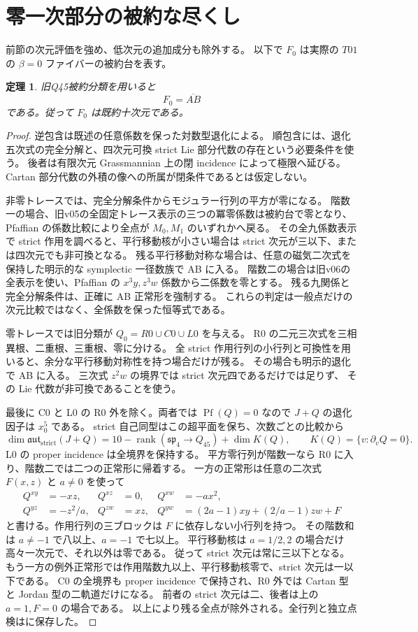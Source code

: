 \documentclass[11pt,a4paper]{ltjsarticle}
\DeclareMathOperator{\rank}{rank}
\newtheorem{theorem}{定理}[section]
\theoremstyle{remark}
\begin{document}
\section{零一次部分の被約な尽くし}
前節の次元評価を強め、低次元の追加成分も除外する。
以下で $F_0$ は実際の $T01$ の $\beta=0$ ファイバーの被約台を表す。
\begin{theorem}\label{thm:zero-jet-exhaustion-v34}
旧Q45被約分類を用いると
\[
 F_0=\overline{AB}
\]
である。従って $F_0$ は既約十次元である。
\end{theorem}
\begin{proof}
逆包含は既述の任意係数を保った対数型退化による。
順包含には、退化五次式の完全分解と、四次元可換 strict Lie 部分代数の存在という必要条件を使う。
後者は有限次元 Grassmannian 上の閉 incidence によって極限へ延びる。
Cartan 部分代数の外積の像への所属が閉条件であるとは仮定しない。

非零トレースでは、完全分解条件からモジュラー行列の平方が零になる。
階数一の場合、旧v05の全固定トレース表示の三つの冪零係数は被約台で零となり、
Pfaffian の係数比較により全点が $M_0,M_1$ のいずれかへ戻る。
その全九係数表示で strict 作用を調べると、平行移動核が小さい場合は
strict 次元が三以下、または四次元でも非可換となる。
残る平行移動対称な場合は、任意の磁気二次式を保持した明示的な symplectic 一径数族で AB に入る。
階数二の場合は旧v06の全表示を使い、Pfaffian の $x^3y,z^3w$ 係数から二係数を零とする。
残る九関係と完全分解条件は、正確に AB 正常形を強制する。
これらの判定は一般点だけの次元比較ではなく、全係数を保った恒等式である\cite{zero-jet-all-v34}。

零トレースでは旧分類が $Q_0=R0\cup C0\cup L0$ を与える。
R0 の二元三次式を三相異根、二重根、三重根、零に分ける。
全 strict 作用行列の小行列と可換性を用いると、余分な平行移動対称性を持つ場合だけが残る。
その場合も明示的退化で AB に入る。
三次式 $z^2w$ の境界では strict 次元四であるだけでは足りず、
その Lie 代数が非可換であることを使う\cite{zero-jet-all-v34}。

最後に C0 と L0 の R0 外を除く。両者では $\operatorname{Pf}(Q)=0$ なので
$J+Q$ の退化因子は $x_0^5$ である。
strict 自己同型はこの超平面を保ち、次数ごとの比較から
\[
 \dim\mathfrak{aut}_{\mathrm{strict}}(J+Q)
 =10-\rank(\mathfrak{sp}_4\longrightarrow Q_{45})
       +\dim K(Q),\qquad K(Q)=\{v:\partial_vQ=0\}.
\]
L0 の proper incidence は全境界を保持する。
平方零行列が階数一なら R0 に入り、階数二では二つの正常形に帰着する。
一方の正常形は任意の二次式 $F(x,z)$ と $a\ne0$ を使って
\[
\begin{aligned}
Q^{xy}&=-xz,&Q^{xz}&=0,&Q^{xw}&=-a x^2,\\
Q^{yz}&=-z^2/a,&Q^{zw}&=xz,&
Q^{yw}&=(2a-1)xy+(2/a-1)zw+F
\end{aligned}
\]
と書ける。作用行列の三ブロックは $F$ に依存しない小行列を持つ。
その階数和は $a\ne-1$ で八以上、$a=-1$ で七以上。
平行移動核は $a=1/2,2$ の場合だけ高々一次元で、それ以外は零である。
従って strict 次元は常に三以下となる。
もう一方の例外正常形では作用階数九以上、平行移動核零で、strict 次元は一以下である。
C0 の全境界も proper incidence で保持され、R0 外では Cartan 型と Jordan 型の二軌道だけになる。
前者の strict 次元は二、後者は上の $a=1,F=0$ の場合である。
以上により残る全点が除外される。全行列と独立点検は\cite{zero-jet-all-v34}に保存した。
\end{proof}
\end{document}

